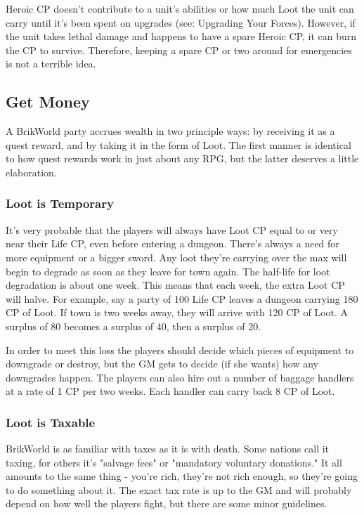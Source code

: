 \documentclass[12pt,a4paper,twocolumn]{article}
\begin{document}
Heroic CP doesn't contribute to a unit's abilities or how much Loot the unit can carry until it's been spent on upgrades (see: Upgrading Your Forces).  However, if the unit takes lethal damage and happens to have a spare Heroic CP, it can burn the CP to survive.  Therefore, keeping a spare CP or two around for emergencies is not a terrible idea.

\subsection{Get Money}

A BrikWorld party accrues wealth in two principle ways: by receiving it as a quest reward, and by taking it in the form of Loot.  The first manner is identical to how quest rewards work in just about any RPG, but the latter deserves a little elaboration.

\subsubsection{Loot is Temporary}

It's very probable that the players will always have Loot CP equal to or very near their Life CP, even before entering a dungeon.  There's always a need for more equipment or a bigger sword.  Any loot they're carrying over the max will begin to degrade as soon as they leave for town again.  The half-life for loot degradation is about one week.  This means that each week, the extra Loot CP will halve.  For example, say a party of 100 Life CP leaves a dungeon carrying 180 CP of Loot.  If town is two weeks away, they will arrive with 120 CP of Loot.  A surplus of 80 becomes a surplus of 40, then a surplus of 20.  

In order to meet this loss the players should decide which pieces of equipment to downgrade or destroy, but the GM gets to decide (if she wants) how any downgrades happen.  The players can also hire out a number of baggage handlers at a rate of 1 CP per two weeks.  Each handler can carry back 8 CP of Loot.

\subsubsection{Loot is Taxable}

BrikWorld is as familiar with taxes as it is with death.  Some nations call it taxing, for others it's "salvage fees" or "mandatory voluntary donations."  It all amounts to the same thing - you're rich, they're not rich enough, so they're going to do something about it.  The exact tax rate is up to the GM and will probably depend on how well the players fight, but there are some minor guidelines. 
\end{document}
